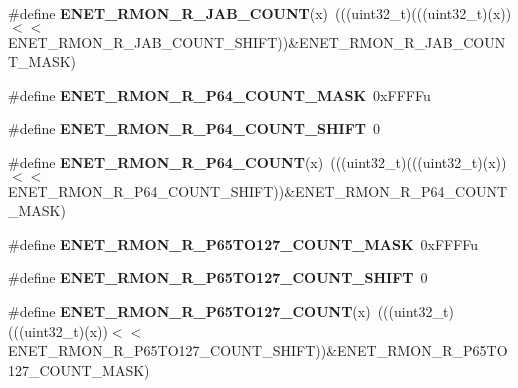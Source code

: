 \begin{DoxyCompactItemize}
\item 
\#define {\bfseries E\+N\+E\+T\+\_\+\+R\+M\+O\+N\+\_\+\+R\+\_\+\+J\+A\+B\+\_\+\+C\+O\+U\+NT}(x)~(((uint32\+\_\+t)(((uint32\+\_\+t)(x))$<$$<$E\+N\+E\+T\+\_\+\+R\+M\+O\+N\+\_\+\+R\+\_\+\+J\+A\+B\+\_\+\+C\+O\+U\+N\+T\+\_\+\+S\+H\+I\+FT))\&E\+N\+E\+T\+\_\+\+R\+M\+O\+N\+\_\+\+R\+\_\+\+J\+A\+B\+\_\+\+C\+O\+U\+N\+T\+\_\+\+M\+A\+SK)\hypertarget{group__ENET__Register__Masks_gaf4a53632e9204c3fa6b812bb2c924976}{}\label{group__ENET__Register__Masks_gaf4a53632e9204c3fa6b812bb2c924976}

\item 
\#define {\bfseries E\+N\+E\+T\+\_\+\+R\+M\+O\+N\+\_\+\+R\+\_\+\+P64\+\_\+\+C\+O\+U\+N\+T\+\_\+\+M\+A\+SK}~0x\+F\+F\+F\+Fu\hypertarget{group__ENET__Register__Masks_ga68d9c25cccce4ef0703577bf06b5bb58}{}\label{group__ENET__Register__Masks_ga68d9c25cccce4ef0703577bf06b5bb58}

\item 
\#define {\bfseries E\+N\+E\+T\+\_\+\+R\+M\+O\+N\+\_\+\+R\+\_\+\+P64\+\_\+\+C\+O\+U\+N\+T\+\_\+\+S\+H\+I\+FT}~0\hypertarget{group__ENET__Register__Masks_gaf011d25e6625c11c485b9081f2b9a611}{}\label{group__ENET__Register__Masks_gaf011d25e6625c11c485b9081f2b9a611}

\item 
\#define {\bfseries E\+N\+E\+T\+\_\+\+R\+M\+O\+N\+\_\+\+R\+\_\+\+P64\+\_\+\+C\+O\+U\+NT}(x)~(((uint32\+\_\+t)(((uint32\+\_\+t)(x))$<$$<$E\+N\+E\+T\+\_\+\+R\+M\+O\+N\+\_\+\+R\+\_\+\+P64\+\_\+\+C\+O\+U\+N\+T\+\_\+\+S\+H\+I\+FT))\&E\+N\+E\+T\+\_\+\+R\+M\+O\+N\+\_\+\+R\+\_\+\+P64\+\_\+\+C\+O\+U\+N\+T\+\_\+\+M\+A\+SK)\hypertarget{group__ENET__Register__Masks_ga8504b7e1afe4a8f7f4d660ce32a0bb60}{}\label{group__ENET__Register__Masks_ga8504b7e1afe4a8f7f4d660ce32a0bb60}

\item 
\#define {\bfseries E\+N\+E\+T\+\_\+\+R\+M\+O\+N\+\_\+\+R\+\_\+\+P65\+T\+O127\+\_\+\+C\+O\+U\+N\+T\+\_\+\+M\+A\+SK}~0x\+F\+F\+F\+Fu\hypertarget{group__ENET__Register__Masks_ga2a632b9df359a8efad215ab90dc33157}{}\label{group__ENET__Register__Masks_ga2a632b9df359a8efad215ab90dc33157}

\item 
\#define {\bfseries E\+N\+E\+T\+\_\+\+R\+M\+O\+N\+\_\+\+R\+\_\+\+P65\+T\+O127\+\_\+\+C\+O\+U\+N\+T\+\_\+\+S\+H\+I\+FT}~0\hypertarget{group__ENET__Register__Masks_gac93f4bae8a600e98833a132aa02065a0}{}\label{group__ENET__Register__Masks_gac93f4bae8a600e98833a132aa02065a0}

\item 
\#define {\bfseries E\+N\+E\+T\+\_\+\+R\+M\+O\+N\+\_\+\+R\+\_\+\+P65\+T\+O127\+\_\+\+C\+O\+U\+NT}(x)~(((uint32\+\_\+t)(((uint32\+\_\+t)(x))$<$$<$E\+N\+E\+T\+\_\+\+R\+M\+O\+N\+\_\+\+R\+\_\+\+P65\+T\+O127\+\_\+\+C\+O\+U\+N\+T\+\_\+\+S\+H\+I\+FT))\&E\+N\+E\+T\+\_\+\+R\+M\+O\+N\+\_\+\+R\+\_\+\+P65\+T\+O127\+\_\+\+C\+O\+U\+N\+T\+\_\+\+M\+A\+SK)\hypertarget{group__ENET__Register__Masks_ga38f2ba6958a5e0b6b5b4d147037e0c78}{}\label{group__ENET__Register__Masks_ga38f2ba6958a5e0b6b5b4d147037e0c78}


\end{DoxyCompactItemize}
